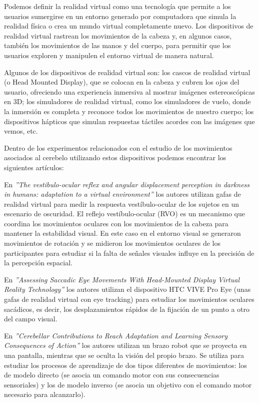 \documentclass[a4paper,11pt, oneside]{book}
\begin{document}
Podemos definir la realidad virtual como una tecnología que permite a los usuarios sumergirse en un entorno generado por computadora que simula la realidad física o crea un mundo virtual completamente nuevo. Los dispositivos de realidad virtual rastrean los movimientos de la cabeza y, en algunos casos, también los movimientos de las manos y del cuerpo, para permitir que los usuarios exploren y manipulen el entorno virtual de manera natural. 

Algunos de los dispositivos de realidad virtual son: los cascos de realidad virtual (o Head Mounted Display), que se colocan en la cabeza y cubren los ojos del usuario, ofreciendo una experiencia inmersiva al mostrar imágenes estereoscópicas en 3D; los simuladores de realidad virtual, como los simuladores de vuelo, donde la inmersión es completa y reconoce todos los movimientos de nuestro cuerpo; los dispositivos hápticos que simulan respuestas táctiles acordes con las imágenes que vemos, etc.

Dentro de los experimentos relacionados con el estudio de los movimientos asociados al cerebelo utilizando estos dispositivos podemos encontrar los siguientes artículos:


En \textit{''The vestibulo-ocular reflex and angular displacement perception in darkness in humans: adaptation to a virtual environment''}\cite{vor} los autores utilizan gafas de realidad virtual para medir la respuesta vestíbulo-ocular de los sujetos en un escenario de oscuridad. El reflejo vestíbulo-ocular (RVO) es un mecanismo que coordina los movimientos oculares con los movimientos de la cabeza para mantener la estabilidad visual. En este caso en el entorno visual se generaron movimientos de rotación y se midieron los movimientos oculares de los participantes para estudiar si la falta de señales visuales influye en la precisión de la percepción espacial.


En \textit{''Assessing Saccadic Eye Movements
	With Head-Mounted Display Virtual
	Reality Technology''}\cite{saccadic} los autores utilizan el dispositivo HTC VIVE Pro Eye\cite{eye} (unas gafas de realidad virtual con eye tracking) para estudiar los movimientos oculares sacádicos, es decir, los desplazamientos rápidos de la fijación de un punto a otro del campo visual. 
	

En \textit{''Cerebellar Contributions to Reach Adaptation and Learning Sensory Consequences of Action''}\cite{cerebellar} los autores utilizan un brazo robot que se proyecta en una pantalla, mientras que se oculta la visión del propio brazo. Se utiliza para estudiar los procesos de aprendizaje de dos tipos diferentes de movimientos: los de modelo directo (se asocia un comando motor con sus consecuencias sensoriales) y los de modelo inverso (se asocia un objetivo con el comando motor necesario para alcanzarlo).
\end{document}
